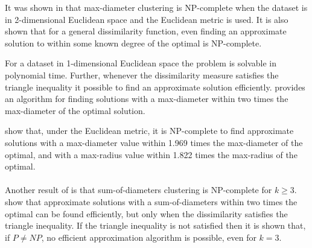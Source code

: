 \documentclass[a4paper]{report}
\begin{document}
It was shown in \citet{gonzalez1985clustering} that max-diameter clustering is
NP-complete when the dataset is in 2-dimensional Euclidean space and the
Euclidean metric is used.  It is also shown that for a general dissimilarity
function, even finding an approximate solution to within some known degree of
the optimal is NP-complete.

For a dataset in 1-dimensional Euclidean space the problem is solvable in
polynomial time.  Further, whenever the dissimilarity measure satisfies the
triangle inequality it possible to find an approximate solution efficiently.
\citet{brucker1978complexity} provides an algorithm for finding solutions with
a max-diameter within two times the max-diameter of the optimal solution.

\citet{bern1996approximation} show that, under the Euclidean metric, it is
NP-complete to find approximate solutions with a max-diameter value within
1.969 times the max-diameter of the optimal, and with a max-radius value
within 1.822 times the max-radius of the optimal.
\\\\
\noindent Another result of \citet{brucker1978complexity} is that
sum-of-diameters clustering is NP-complete for $k \geq 3$.
\citet{doddi2000approximation} show that approximate solutions with a
sum-of-diameters within two times the optimal can be found efficiently, but
only when the dissimilarity satisfies the triangle inequality.  If the
triangle inequality is not satisfied then it is shown that, if $P \neq NP$, no
efficient approximation algorithm is possible, even for $k=3$.
\end{document}
